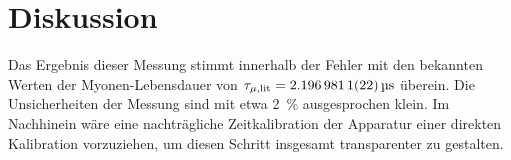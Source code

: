 \section{Diskussion}
\label{sec:diskussion}
Das Ergebnis dieser Messung stimmt innerhalb der Fehler mit den bekannten
Werten der Myonen-Lebensdauer von $\tau_{\mu,\text{lit}} = \SI{2.1969811+-0.0000022}{\micro \second}$ \cite{pdgonline} überein.
Die Unsicherheiten der Messung sind mit etwa \SI{2}{\percent}
ausgesprochen klein.
Im Nachhinein wäre eine nachträgliche Zeitkalibration der Apparatur
einer direkten Kalibration vorzuziehen, um diesen Schritt insgesamt
transparenter zu gestalten.
